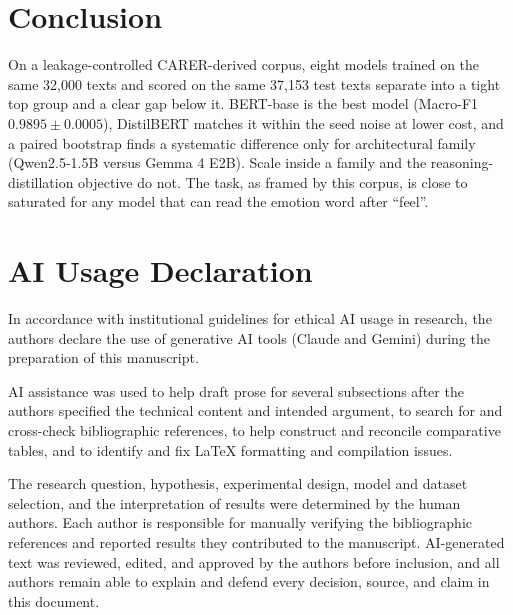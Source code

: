 \documentclass[conference]{IEEEtran}
\begin{document}
\section{Conclusion}
\label{sec:conclusion}

On a leakage-controlled CARER-derived corpus, eight models trained on the same 32,000 texts and scored on the same 37,153 test texts separate into a tight top group and a clear gap below it. BERT-base is the best model (Macro-F1 $0.9895 \pm 0.0005$), DistilBERT matches it within the seed noise at lower cost, and a paired bootstrap finds a systematic difference only for architectural family (Qwen2.5-1.5B versus Gemma 4 E2B). Scale inside a family and the reasoning-distillation objective do not. The task, as framed by this corpus, is close to saturated for any model that can read the emotion word after ``feel''.

\section*{AI Usage Declaration}
In accordance with institutional guidelines for ethical AI usage in research, the authors declare the use of generative AI tools 
(Claude and Gemini) during the preparation of this manuscript.

AI assistance was used to help draft prose for several subsections after the authors specified the technical content and intended 
argument, to search for and cross-check bibliographic references, to help construct and reconcile comparative tables, and to identify 
and fix LaTeX formatting and compilation issues.

The research question, hypothesis, experimental design, model and dataset selection, and the interpretation of results were determined 
by the human authors. Each author is responsible for manually verifying the bibliographic references and reported results they 
contributed to the manuscript. AI-generated text was reviewed, edited, and approved by the authors before inclusion, and all authors 
remain able to explain and defend every decision, source, and claim in this document.


\end{document}

